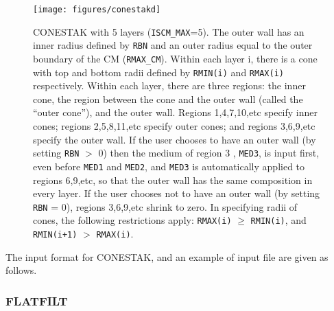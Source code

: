 \documentclass[12pt,twoside]{article}
\begin{document}
\begin{figure}[htbp]
\begin{center}
\leavevmode
\mbox{}\hspace{0cm}
\texttt{[image: figures/conestakd]}
\caption[CONESTAK CM geometry]
{CONESTAK with 5 layers ({\tt ISCM\_MAX}=5).  The outer wall has an inner
radius defined by {\tt RBN} and an outer radius equal to the outer boundary of
the CM ({\tt RMAX\_CM}).  Within each layer i, there is a cone with top and
bottom radii defined by {\tt RMIN(i)} and {\tt RMAX(i)} respectively.  Within each
layer, there are three regions: the inner cone, the
region between the cone and the outer wall (called the ``outer cone''), and the
outer
wall.  Regions 1,4,7,10,etc specify inner cones; regions 2,5,8,11,etc specify
outer cones; and regions 3,6,9,etc specify the outer wall.  If the user chooses
to have an outer wall (by setting {\tt RBN} $>$ 0) then the medium of region 3
, {\tt MED3}, is input first, even before {\tt MED1} and {\tt MED2}, and
{\tt MED3} is automatically applied to regions 6,9,etc, so that the outer
wall has the same composition in every layer.  If the user chooses not to
have an outer wall (by setting {\tt RBN} = 0), regions 3,6,9,etc shrink to
zero.
In specifying radii
of cones, the following restrictions apply: {\tt RMAX(i)} $\geq$ {\tt RMIN(i)}, and
{\tt RMIN(i+1)} $>$ {\tt RMAX(i)}.}
\label{fig_CONESTAKD}
\end{center}
\end{figure}

The input format for CONESTAK, and an example of input file are given as follows.

\begin{small}

\end{small}

\clearpage

\subsubsection{FLATFILT}
\renewcommand{\rightmark}{FLATFILT CM}
\end{document}
